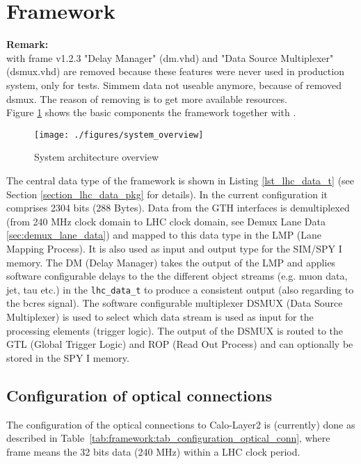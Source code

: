 \section{Framework}\label{sec:framework}
\textbf{Remark:}\\
with frame v1.2.3 "Delay Manager" (dm.vhd) and "Data Source Multiplexer" (dsmux.vhd) are removed because these features were never used in production system, only for tests.
Simmem data not useable anymore, because of removed dsmux.
The reason of removing is to get more available resources.\\

Figure \ref{fig_system_overview} shows the basic components the framework together with \rop.

\begin{figure}[h]
\texttt{[image: ./figures/system\_overview]}
\caption{System architecture overview}
\label{fig_system_overview}
\end{figure}

The central data type of the framework is shown in Listing \ref{lst_lhc_data_t} (see Section \ref{section_lhc_data_pkg} for details). In the current configuration it comprises
2304 bits (288 Bytes). Data from the GTH interfaces is demultiplexed (from 240 MHz clock domain to LHC clock domain, see Demux Lane Data \ref{sec:demux_lane_data}) and mapped to this data type in the LMP (Lane Mapping Process). It is also used as input and output type for the SIM/SPY I memory.
The DM (Delay Manager) takes the output of the LMP and applies software configurable delays to the the different object streams (e.g. muon data, jet, tau etc.) in the \texttt{lhc\_data\_t}
to produce a consistent output (also regarding to the bcres signal). The software configurable multiplexer DSMUX (Data Source Multiplexer) is used to select which data stream is used as
input for the processing elements (trigger logic). The output of the DSMUX is routed to the GTL (Global Trigger Logic) and ROP (Read Out Process) and can optionally be stored in the SPY I memory.

\subsection{Configuration of optical connections} \label{sec:sec_configuration_optical_conn}
The configuration of the optical connections to Calo-Layer2 is (currently) done as described in Table~\ref{tab:framework:tab_configuration_optical_conn}, where
frame means the 32 bits data (240 MHz) within a LHC clock period.

